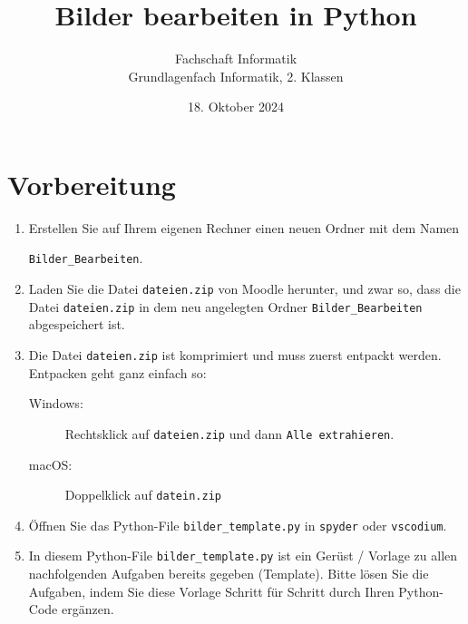 \newtoggle{withbonus} \toggletrue{withbonus} %
\lstset{style=Python}

\newcommand{\mycourse}{Grundlagenfach Informatik}
\newcommand{\myclass}{2. Klassen}
\newcommand{\mydate}{18. Oktober 2024}

\title{\textbf{Bilder bearbeiten in Python}}
\author{Fachschaft Informatik\\
	\mycourse, \myclass}
\date{\mydate}
\maketitle
\thispagestyle{headandfoot}
\clearpage

\section*{Vorbereitung}
\begin{enumerate}
	\item Erstellen Sie auf Ihrem eigenen Rechner einen neuen Ordner  mit dem Namen
	      \begin{center}
		      {\tt Bilder_Bearbeiten}.
	      \end{center}
	\item Laden Sie die Datei {\tt dateien.zip} von Moodle herunter, und zwar so, dass die Datei {\tt dateien.zip} in dem neu angelegten Ordner {\tt Bilder_Bearbeiten} abgespeichert ist.
	\item Die Datei {\tt dateien.zip} ist komprimiert und muss zuerst entpackt werden. Entpacken geht ganz einfach so:
	      \begin{description}
		      \item[Windows:] Rechtsklick auf {\tt dateien.zip} und dann {\tt Alle extrahieren}.
		      \item[macOS:] Doppelklick auf {\tt datein.zip}
	      \end{description}
	\item Öffnen Sie das Python-File {\tt bilder\_template.py} in {\tt spyder} oder {\tt vscodium}.
	\item In diesem Python-File {\tt bilder\_template.py} ist ein Gerüst / Vorlage zu allen nachfolgenden Aufgaben bereits gegeben (Template). Bitte lösen Sie die Aufgaben, indem Sie diese Vorlage Schritt für Schritt durch Ihren Python-Code ergänzen.
\end{enumerate}


